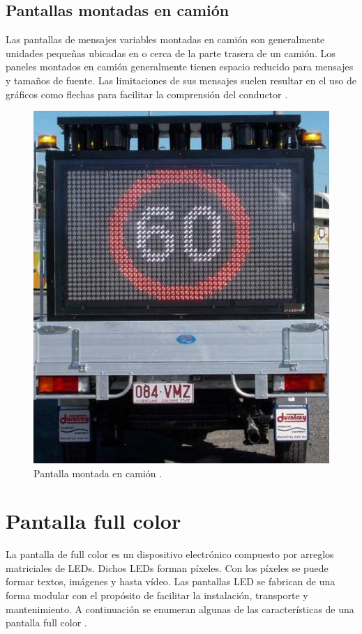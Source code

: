 \pagebreak
\subsection{Pantallas montadas en camión}

Las pantallas de mensajes variables montadas en camión son generalmente unidades pequeñas ubicadas en o cerca de la parte trasera de un camión. Los paneles montados en camión generalmente tienen espacio reducido para mensajes y tamaños de fuente. Las limitaciones de sus mensajes suelen resultar en el uso de gráficos como flechas para facilitar la comprensión del conductor \citep{VMSTYPES}.

\begin{figure}[htpb]
	\centering
	\includegraphics[scale=1]{../Figures/vmstruck.png} 
	\caption{Pantalla montada en camión \protect\footnotemark.}
	\label{fig:vmsc}
\end{figure}


\section{Pantalla full color}
La pantalla de full color es un dispositivo electrónico compuesto por arreglos matriciales de LEDs. Dichos LEDs forman píxeles. Con los píxeles se puede formar textos, imágenes y hasta vídeo. Las pantallas LED se fabrican de una forma modular con el propósito de facilitar la instalación, transporte y mantenimiento. A continuación se enumeran algunas de las características de una pantalla full color \citep{WIKIPANTALLAFULLCOLOR}.


